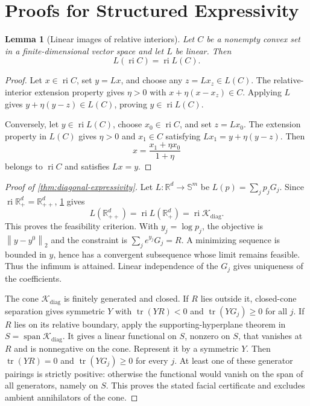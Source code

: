 \documentclass[10pt]{article}
\theoremstyle{plain}
\newtheorem{lemma}[theorem]{Lemma}
\theoremstyle{definition}
\theoremstyle{remark}
\newcommand{\R}{\mathbb R}
\newcommand{\Sym}{\mathbb S}
\newcommand{\tr}{\operatorname{tr}}
\newcommand{\ri}{\operatorname{ri}}
\newcommand{\norm}[1]{\left\lVert #1\right\rVert}
\newcommand{\Kcal}{\mathcal K}
\begin{document}
\section{Proofs for Structured Expressivity}
\label{app:expressivity-proofs}

\begin{lemma}[Linear images of relative interiors]
\label{lem:linear-ri}
Let \(C\) be a nonempty convex set in a finite-dimensional vector space and
let \(L\) be linear.  Then
\begin{equation}
  L(\ri C)=\ri L(C).
  \label{eq:linear-ri}
\end{equation}
\end{lemma}

\begin{proof}
Let \(x\in\ri C\), set \(y=Lx\), and choose any \(z=Lx_z\in L(C)\).
The relative-interior extension property gives \(\eta>0\) with
\(x+\eta(x-x_z)\in C\).  Applying \(L\) gives
\(y+\eta(y-z)\in L(C)\), proving \(y\in\ri L(C)\).

Conversely, let \(y\in\ri L(C)\), choose \(x_0\in\ri C\), and set
\(z=Lx_0\).  The extension property in \(L(C)\) gives \(\eta>0\) and
\(x_1\in C\) satisfying \(Lx_1=y+\eta(y-z)\).  Then
\[
  x=\frac{x_1+\eta x_0}{1+\eta}
\]
belongs to \(\ri C\) and satisfies \(Lx=y\).
\end{proof}

\begin{proof}[Proof of \cref{thm:diagonal-expressivity}]
Let \(L:\R^d\to\Sym^m\) be \(L(p)=\sum_jp_jG_j\).  Since
\(\ri\R_+^d=\R_{++}^d\), \cref{lem:linear-ri} gives
\[
  L(\R_{++}^d)=\ri L(\R_+^d)=\ri\Kcal_{\mathrm{diag}}.
\]
This proves the feasibility criterion.  With \(y_j=\log p_j\), the objective
is \(\norm{y-y^0}_2\) and the constraint is
\(\sum_je^{y_j}G_j=R\).  A minimizing sequence is bounded in \(y\), hence
has a convergent subsequence whose limit remains feasible.  Thus the infimum
is attained.  Linear independence of the \(G_j\) gives uniqueness of the
coefficients.

The cone \(\Kcal_{\mathrm{diag}}\) is finitely generated and closed.  If
\(R\) lies outside it, closed-cone separation gives symmetric \(Y\) with
\(\tr(YR)<0\) and \(\tr(YG_j)\ge0\) for all \(j\).  If \(R\) lies on its
relative boundary, apply the supporting-hyperplane theorem in
\(S=\operatorname{span}\Kcal_{\mathrm{diag}}\).  It gives a linear
functional on \(S\), nonzero on \(S\), that vanishes at \(R\) and is
nonnegative on the cone.  Represent it by a symmetric \(Y\).  Then
\(\tr(YR)=0\) and \(\tr(YG_j)\ge0\) for every \(j\).  At least one of these
generator pairings is strictly positive: otherwise the functional would
vanish on the span of all generators, namely on \(S\).  This proves the
stated facial certificate and excludes ambient annihilators of the cone.
\end{proof}
\end{document}
